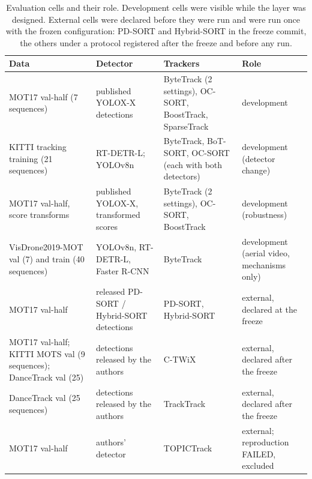 \begin{table}[t]
\caption{Evaluation cells and their role. Development cells were visible while
the layer was designed. External cells were declared before they were run and
were run once with the frozen configuration: PD-SORT and Hybrid-SORT in the
freeze commit, the others under a protocol registered after the freeze and
before any run.}
\label{tab:data}
\centering\footnotesize
\setlength{\tabcolsep}{3pt}
\begin{tabular}{@{}>{\raggedright\arraybackslash}p{31mm}>{\raggedright\arraybackslash}p{28mm}>{\raggedright\arraybackslash}p{35mm}>{\raggedright\arraybackslash}p{26mm}@{}}
\toprule
Data & Detector & Trackers & Role\\
\midrule
MOT17 val-half (7 sequences) & published YOLOX-X detections & ByteTrack (2 settings), OC-SORT, BoostTrack, SparseTrack & development\\
KITTI tracking training (21 sequences) & RT-DETR-L; YOLOv8n & ByteTrack, BoT-SORT, OC-SORT (each with both detectors) & development (detector change)\\
MOT17 val-half, score transforms & published YOLOX-X, transformed scores & ByteTrack (2 settings), OC-SORT, BoostTrack & development (robustness)\\
VisDrone2019-MOT val (7) and train (40 sequences) & YOLOv8n, RT-DETR-L, Faster R-CNN & ByteTrack & development (aerial video, mechanisms only)\\
MOT17 val-half & released PD-SORT / Hybrid-SORT detections & PD-SORT, Hybrid-SORT & external, declared at the freeze\\
MOT17 val-half; KITTI MOTS val (9 sequences); DanceTrack val (25) & detections released by the authors & C-TWiX & external, declared after the freeze\\
DanceTrack val (25 sequences) & detections released by the authors & TrackTrack & external, declared after the freeze\\
MOT17 val-half & authors' detector & TOPICTrack & external; reproduction FAILED, excluded\\
\bottomrule
\end{tabular}
\end{table}

